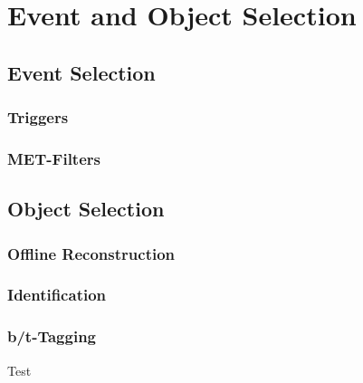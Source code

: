 
\chapter{Event and Object Selection}

\section{Event Selection}
\subsection{Triggers}
\subsection{MET-Filters}


\section{Object Selection}
\subsection{Offline Reconstruction}
\subsection{Identification}
\subsection{b/t-Tagging}
Test\cite{CMS:CMS-PAS-BTV-15-001}